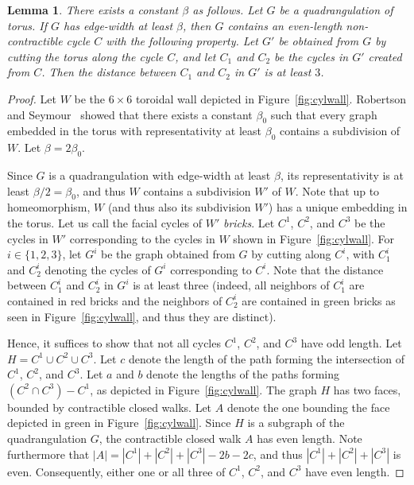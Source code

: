 \documentclass[12pt,twoside,openright,a4paper]{book}
\newtheorem{lemma}[theorem]{Lemma}
\begin{document}
\begin{lemma}\label{lemma:torus-cut-dist}
There exists a constant $\beta$ as follows.
Let $G$ be a quadrangulation of torus. If $G$ has edge-width at least $\beta$, then $G$ contains
an even-length non-contractible cycle $C$ with the following property.
Let $G'$ be obtained from $G$ by cutting the torus along the cycle $C$, and let $C_1$ and $C_2$ be the cycles
in $G'$ created from $C$. Then the distance between $C_1$ and $C_2$ in $G'$ is at least $3$.
\end{lemma}
\begin{proof}
Let $W$ be the $6\times 6$ toroidal wall depicted in Figure~\ref{fig:cylwall}.  Robertson and Seymour~\cite{rs12}
showed that there exists a constant $\beta_0$ such that every graph embedded in the torus with representativity
at least $\beta_0$ contains a subdivision of $W$.  Let $\beta=2\beta_0$.

Since $G$ is a quadrangulation with edge-width at least $\beta$, its representativity is at least $\beta/2=\beta_0$,
and thus $W$ contains a subdivision $W'$ of $W$.  Note that up to homeomorphism, $W$ (and thus also its subdivision $W'$)
has a unique embedding in the torus.  Let us call the facial cycles of $W'$ \emph{bricks}.
Let $C^1$, $C^2$, and $C^3$ be the cycles in $W'$ corresponding to the cycles in $W$
shown in  Figure~\ref{fig:cylwall}.  For $i\in\{1,2,3\}$, let $G^i$ be the graph obtained from $G$ by cutting along $C^i$,
with $C^i_1$ and $C^i_2$ denoting the cycles of $G^i$ corresponding to $C^i$.  Note that the distance between $C^i_1$ and $C^i_2$
in $G^i$ is at least three (indeed, all neighbors of $C^i_1$ are contained in red bricks and the neighbors of $C^i_2$
are contained in green bricks as seen in Figure~\ref{fig:cylwall}, and thus they are distinct).

Hence, it suffices to show that not all cycles $C^1$, $C^2$, and $C^3$ have odd length.  Let $H=C^1\cup C^2\cup C^3$.
Let $c$ denote the length of the path forming the intersection of $C^1$, $C^2$, and $C^3$.  Let $a$ and $b$ denote the lengths
of the paths forming $(C^2\cap C^3)-C^1$, as depicted in Figure~\ref{fig:cylwall}.
The graph $H$ has two faces, bounded by contractible closed walks.  Let $A$ denote the one bounding the face depicted in green in Figure~\ref{fig:cylwall}.
Since $H$ is a subgraph of the quadrangulation $G$, the contractible closed walk $A$ has even length.  Note furthermore
that $|A|=|C^1|+|C^2|+|C^3|-2b-2c$, and thus $|C^1|+|C^2|+|C^3|$ is even.  Consequently, either one or all three of
$C^1$, $C^2$, and $C^3$ have even length.
\end{proof}
\end{document}
